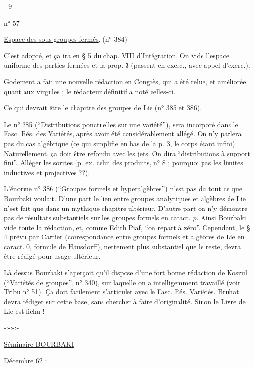 \begin{center}- 9 -\end{center}
\hfill n° 57

\uline{Espace des sous-groupes fermés}, (n° 384)

C'est adopté, et ça ira en § 5 du chap. VIII d'Intégration. On vide l'espace uniforme des parties fermées et la prop. 3 (passent en exerc., avec appel d'exerc.).

Godement a fait une nouvelle rédaction en Congrès, qui a été relue, et améliorée quant aux virgules ; le rédacteur définitif a noté celles-ci.

\uline{Ce qui devrait être le chapitre des groupes de Lie} (n° 385 et 386).

Le n° 385 (``Distributions ponctuelles sur une variété''), sera incorporé dans le Fasc. Rés. des Variétés, après avoir été considérablement allégé. On n'y parlera pas du cas algébrique (ce qui simplifie en bas de la p. 3, le corps étant infini). Naturellement, ça doit être refondu avec les jets. On dira ``distributions à support fini''. Alléger les sorites (p. ex. celui des produits, n° 8 ; pourquoi pas les limites inductives et projectives ??).

L'énorme n° 386 (``Groupes formels et hyperalgèbres'') n'est pas du tout ce que Bourbaki voulait. D'une part le lien entre groupes analytiques et algèbres de Lie n'est fait que dans un mythique chapitre ultérieur. D'autre part on n'y démontre pas de résultats substantiels sur les groupes formels en caract. $p$. Ainsi Bourbaki vide toute la rédaction, et, comme Edith Piaf, ``on repart à zéro''. Cependant, le § 4 prévu par Cartier (correspondance entre groupes formels et algèbres de Lie en caract. 0, formule de Hausdorff), nettement plus substantiel que le reste, devra être rédigé pour usage ultérieur.

Là dessus Bourbaki s'aperçoit qu'il dispose d'une fort bonne rédaction de Koszul (``Variétés de groupes'', n° 340), sur laquelle on a intelligemment travaillé (voir Tribu n° 51). Ça doit facilement s'articuler avec le Fasc. Rés. Variétés. Bruhat devra rédiger sur cette base, sans chercher à faire d'originalité. Sinon le Livre de Lie est fichu !

\begin{center}-:-:-:-\end{center}
\begin{center}\uline{Séminaire BOURBAKI}\end{center}
Décembre 62 :

